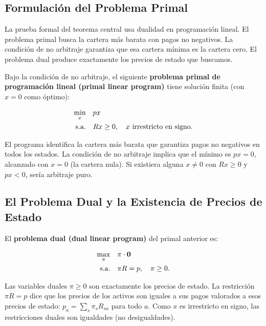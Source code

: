 \documentclass[12pt]{article}
\begin{document}
\subsection{Formulaci\'on del Problema Primal}

\begin{intuicion}
La prueba formal del teorema central usa dualidad en programaci\'on lineal. El problema primal busca la cartera m\'as barata con pagos no negativos. La condici\'on de no arbitraje garantiza que esa cartera m\'inima es la cartera cero. El problema dual produce exactamente los precios de estado que buscamos.
\end{intuicion}

Bajo la condici\'on de no arbitraje, el siguiente \textbf{problema primal de programaci\'on lineal (primal linear program)} tiene soluci\'on finita (con $x = 0$ como \'optimo):

\begin{align}
  \min_{x}\quad &px \notag \\
  \text{s.a.}\quad &Rx \geq 0, \quad x \text{ irrestricto en signo.}
  \label{eq:primal}
\end{align}

\begin{intuicionmat}
El programa identifica la cartera m\'as barata que garantiza pagos no negativos en todos los estados. La condici\'on de no arbitraje implica que el m\'inimo es $px = 0$, alcanzado con $x = 0$ (la cartera nula). Si existiera alguna $x \neq 0$ con $Rx \geq 0$ y $px < 0$, ser\'ia arbitraje puro.
\end{intuicionmat}

\subsection{El Problema Dual y la Existencia de Precios de Estado}

El \textbf{problema dual (dual linear program)} del primal anterior es:

\begin{align}
  \max_{\pi}\quad &\pi \cdot \mathbf{0} \notag \\
  \text{s.a.}\quad &\pi R = p, \quad \pi \geq 0.
  \label{eq:dual}
\end{align}

\begin{intuicionmat}
Las variables duales $\pi \geq 0$ son exactamente los precios de estado. La restricci\'on $\pi R = p$ dice que los precios de los activos son iguales a sus pagos valorados a esos precios de estado: $p_a = \sum_s \pi_s R_{sa}$ para todo $a$. Como $x$ es irrestricto en signo, las restricciones duales son igualdades (no desigualdades).
\end{intuicionmat}
\end{document}
